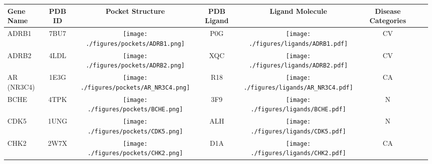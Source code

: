 \begin{ThreePartTable}
\begin{longtable}{l @{\extracolsep{\fill}} *{7}{c}}
\label{tab:dataset_full}
\toprule
\textbf{Gene Name} & \textbf{PDB ID} & \textbf{Pocket Structure} & \textbf{PDB \mbox{Ligand}} & \textbf{Ligand Molecule} & \textbf{Disease \mbox{Categories}}                         \\ \midrule
ADRB1                                 & 7BU7            &   \texttt{[image: ./figures/pockets/ADRB1.png]}                        & P0G                    &\texttt{[image: ./figures/ligands/ADRB1.pdf]}                                                  & CV                              \\
ADRB2                                 & 4LDL            &   \texttt{[image: ./figures/pockets/ADRB2.png]}                        & XQC                    &\texttt{[image: ./figures/ligands/ADRB2.pdf]}                                                  & CV                              \\
AR (NR3C4)                            & 1E3G            &    \texttt{[image: ./figures/pockets/AR\_NR3C4.png]}                       & R18                    &\texttt{[image: ./figures/ligands/AR\_NR3C4.pdf]}                                                 & CA                                              \\
BCHE                                  & 4TPK            &    \texttt{[image: ./figures/pockets/BCHE.png]}                       & 3F9                    &\texttt{[image: ./figures/ligands/BCHE.pdf]}                                                 & N                             \\
CDK5                                  & 1UNG            &     \texttt{[image: ./figures/pockets/CDK5.png]}                      & ALH                    &\texttt{[image: ./figures/ligands/CDK5.pdf]}                                                & N                             \\
CHK2                                  & 2W7X            &      \texttt{[image: ./figures/pockets/CHK2.png]}                     & D1A                    &\texttt{[image: ./figures/ligands/CHK2.pdf]}                                               & CA                                              \\

\end{longtable}
\end{ThreePartTable}
